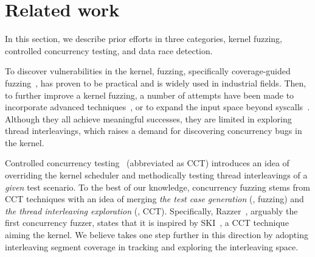 \section{Related work}
\label{s:relwk}

%
In this section, we describe prior efforts in three categories, kernel
fuzzing, controlled concurrency testing, and data race detection.


%
To discover vulnerabilities in the kernel, fuzzing, specifically
coverage-guided fuzzing~\cite{syzkaller, moonshine, healer, hfl, imf,
  janus, hydra, trinity, kafl, periscope, syzvegas, ksg}, has proven
to be practical and is widely used in industrial fields.
%
%
Then, to further improve a kernel fuzzing, a number of attempts have
been made to incorporate advanced techniques~\cite{moonshine, healer, hfl},
%
or to expand the input space beyond syscalls~\cite{janus, hydra,
  periscope}.
%
Although they all achieve meaningful successes, they are limited in
exploring thread interleavings, which raises a demand for discovering
concurrency bugs in the kernel.







%
Controlled concurrency testing~\cite{ski, pctalgorithm, sparsernr,
  chess, nagarakatte2012multicore, abdelrasoul2017promoting,
  cai2016radius, mukherjee2020learning, schedulebounding} (abbreviated
as CCT) introduces an idea of overriding the kernel scheduler and
methodically testing thread interleavings of a \textit{given} test
scenario.
%
%
To the best of our knowledge, concurrency fuzzing stems from CCT
techniques with an idea of merging \textit{the test case generation}
(\ie, fuzzing) and \textit{the thread interleaving exploration} (\ie,
CCT).
%
Specifically, Razzer~\cite{razzer}, arguably the first concurrency
fuzzer, states that it is inspired by SKI~\cite{ski}, a CCT technique
aiming the kernel.
%
We believe \sys takes one step further in this direction by adopting
interleaving segment coverage in tracking and exploring the
interleaving space.
%
%



